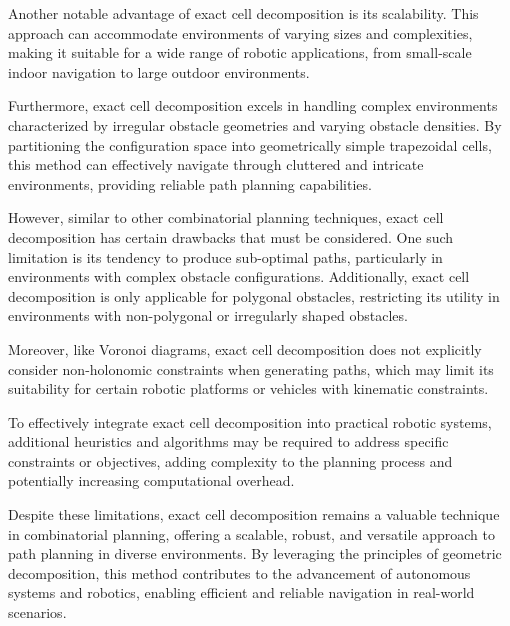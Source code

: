 \vspace*{6mm}


Another notable advantage of exact cell decomposition is its scalability. This approach can accommodate environments of varying sizes and complexities, making it suitable for a wide range of robotic applications, from small-scale indoor navigation to large outdoor environments.

\vspace*{6mm}


Furthermore, exact cell decomposition excels in handling complex environments characterized by irregular obstacle geometries and varying obstacle densities. By partitioning the configuration space into geometrically simple trapezoidal cells, this method can effectively navigate through cluttered and intricate environments, providing reliable path planning capabilities.

\vspace*{6mm}


However, similar to other combinatorial planning techniques, exact cell decomposition has certain drawbacks that must be considered. One such limitation is its tendency to produce sub-optimal paths, particularly in environments with complex obstacle configurations. Additionally, exact cell decomposition is only applicable for polygonal obstacles, restricting its utility in environments with non-polygonal or irregularly shaped obstacles.

\vspace*{6mm}


Moreover, like Voronoi diagrams, exact cell decomposition does not explicitly consider non-holonomic constraints when generating paths, which may limit its suitability for certain robotic platforms or vehicles with kinematic constraints.

\vspace*{6mm}


To effectively integrate exact cell decomposition into practical robotic systems, additional heuristics and algorithms may be required to address specific constraints or objectives, adding complexity to the planning process and potentially increasing computational overhead.

\vspace*{6mm}


Despite these limitations, exact cell decomposition remains a valuable technique in combinatorial planning, offering a scalable, robust, and versatile approach to path planning in diverse environments. By leveraging the principles of geometric decomposition, this method contributes to the advancement of autonomous systems and robotics, enabling efficient and reliable navigation in real-world scenarios.

